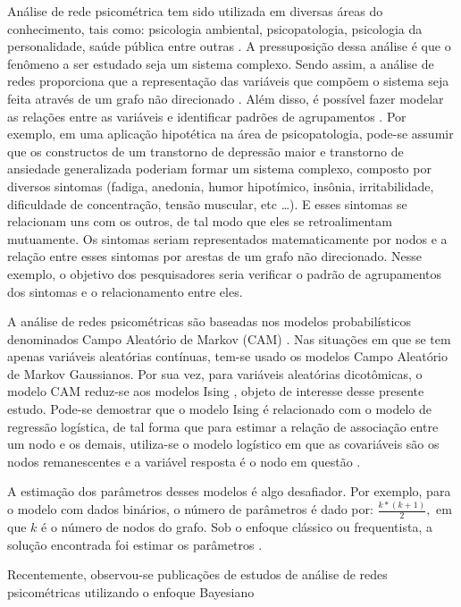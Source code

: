 \documentclass[
  super,
  preprint,
  3p]{elsarticle}
\begin{document}
Análise de rede psicométrica tem sido utilizada em diversas áreas do
conhecimento, tais como: psicologia ambiental, psicopatologia,
psicologia da personalidade, saúde pública entre outras \citep[
]{ZWICKER2020101433, Borsboom2017, COSTANTINI201513, Soares2022}. A
pressuposição dessa análise é que o fenômeno a ser estudado seja um
sistema complexo. Sendo assim, a análise de redes proporciona que a
representação das variáveis que compõem o sistema seja feita através de
um grafo não direcionado \citep{Murphy2012}. Além disso, é possível
fazer modelar as relações entre as variáveis e identificar padrões de
agrupamentos \citep{Epskamp2022}. Por exemplo, em uma aplicação
hipotética na área de psicopatologia, pode-se assumir que os constructos
de um transtorno de depressão maior e transtorno de ansiedade
generalizada poderiam formar um sistema complexo, composto por diversos
sintomas (fadiga, anedonia, humor hipotímico, insônia, irritabilidade,
dificuldade de concentração, tensão muscular, etc \ldots). E esses
sintomas se relacionam uns com os outros, de tal modo que eles se
retroalimentam mutuamente. Os sintomas seriam representados
matematicamente por nodos e a relação entre esses sintomas por arestas
de um grafo não direcionado. Nesse exemplo, o objetivo dos pesquisadores
seria verificar o padrão de agrupamentos dos sintomas e o relacionamento
entre eles.

A análise de redes psicométricas são baseadas nos modelos
probabilísticos denominados Campo Aleatório de Markov (CAM)
\citep{Murphy2012}. Nas situações em que se tem apenas variáveis
aleatórias contínuas, tem-se usado os modelos Campo Aleatório de Markov
Gaussianos. Por sua vez, para variáveis aleatórias dicotômicas, o modelo
CAM reduz-se aos modelos Ising \citep{Murphy2012}, objeto de interesse
desse presente estudo. Pode-se demostrar que o modelo Ising é
relacionado com o modelo de regressão logística, de tal forma que para
estimar a relação de associação entre um nodo e os demais, utiliza-se o
modelo logístico em que as covariáveis são os nodos remanescentes e a
variável resposta é o nodo em questão \citep{vanBorkulo}.

A estimação dos parâmetros desses modelos é algo desafiador. Por
exemplo, para o modelo com dados binários, o número de parâmetros é dado
por: \(\frac{k*(k+1)}{2},\) em que \(k\) é o número de nodos do grafo.
Sob o enfoque clássico ou frequentista, a solução encontrada foi estimar
os parâmetros \citep{Epskamp2018}.

Recentemente, observou-se publicações de estudos de análise de redes
psicométricas utilizando o enfoque Bayesiano
\end{document}
